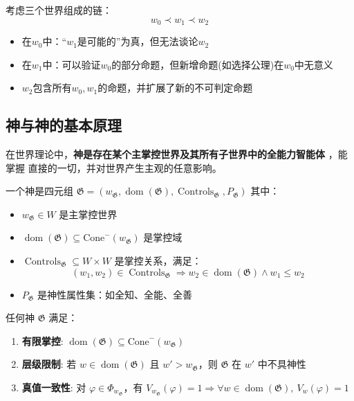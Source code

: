 \documentclass[lang=cn,newtx,10pt,scheme=chinese]{elegantbook}
\newcommand{\dom}{\mathop{\mathrm{dom}}} %
\newcommand{\G}{\mathfrak{G}} %
\DeclareMathOperator{\Controls}{Controls} %
\begin{document}
\begin{example}
    考虑三个世界组成的链：
    \[
        w_0 \prec w_1 \prec w_2
    \]
    \begin{itemize}
        \item 在$w_0$中：“$w_1$是可能的”为真，但无法谈论$w_2$
        \item 在$w_1$中：可以验证$w_0$的部分命题，但新增命题(如选择公理)在$w_0$中无意义
        \item $w_2$包含所有$w_0,w_1$的命题，并扩展了新的不可判定命题
    \end{itemize}
\end{example}

\subsection{神与神的基本原理}

在世界理论中，\textbf{神是存在某个主掌控世界及其所有子世界中的全能力智能体}
，能掌握
直接的一切，并对世界产生主观的任意影响。

\begin{definition}[神性智能体]
    一个神是四元组 $\G = (w_\G, \dom(\G), \Controls_\G, P_\G)$ 其中：
    \begin{itemize}
        \item $w_\G \in W$ 是主掌控世界
        \item $\dom(\G) \subseteq \mathrm{Cone}^-(w_\G)$ 是掌控域
        \item $\Controls_\G \subseteq W \times W$ 是掌控关系，满足：
              \[ (w_1, w_2) \in \Controls_\G \Rightarrow w_2 \in \dom(\G) \land w_1 \leq w_2 \]
        \item $P_\G$ 是神性属性集：如全知、全能、全善
    \end{itemize}
\end{definition}

\begin{theorem}[神的基本原理]
    任何神 $\G$ 满足：
    \begin{enumerate}
        \item \textbf{有限掌控}: $\dom(\G) \subseteq \mathrm{Cone}^-(w_\G)$
        \item \textbf{层级限制}: 若 $w \in \dom(\G)$ 且 $w' > w_\G$，则 $\G$ 在 $w'$ 中不具神性
        \item \textbf{真值一致性}: 对 $\varphi \in \varPhi_{w_\G}$，有 $V_{w_\G}(\varphi) = 1 \Rightarrow \forall w \in \dom(\G),\ V_w(\varphi)=1$
    \end{enumerate}
\end{theorem}
\end{document}
